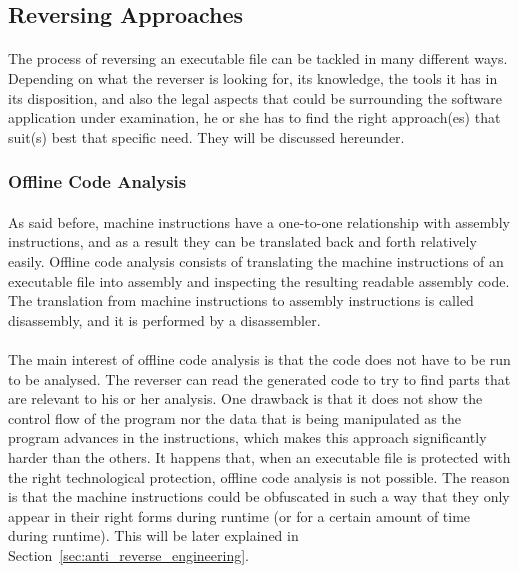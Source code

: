 \subsection{Reversing Approaches} \label{ssec:reversing_approaches}
\paragraph{}
The process of reversing an executable file can be tackled in many different ways. Depending on what the reverser is looking for, its knowledge, the tools it has in its disposition, and also the legal aspects that could be surrounding the software application under examination, he or she has to find the right approach(es) that suit(s) best that specific need. They will be discussed hereunder.

\subsubsection{Offline Code Analysis}
\paragraph{}
As said before, machine instructions have a one-to-one relationship with assembly instructions, and as a result they can be translated back and forth relatively easily. Offline code analysis consists of translating the machine instructions of an executable file into assembly and inspecting the resulting readable assembly code. The translation from machine instructions to assembly instructions is called disassembly, and it is performed by a disassembler.

\paragraph{}
The main interest of offline code analysis is that the code does not have to be run to be analysed. The reverser can read the generated code to try to find parts that are relevant to his or her analysis.
One drawback is that it does not show the control flow of the program nor the data that is being manipulated as the program advances in the instructions, which makes this approach significantly harder than the others.
It happens that, when an executable file is protected with the right technological protection, offline code analysis is not possible. The reason is that the machine instructions could be obfuscated in such a way that they only appear in their right forms during runtime (or for a certain amount of time during runtime). This will be later explained in Section~\ref{sec:anti_reverse_engineering}.

